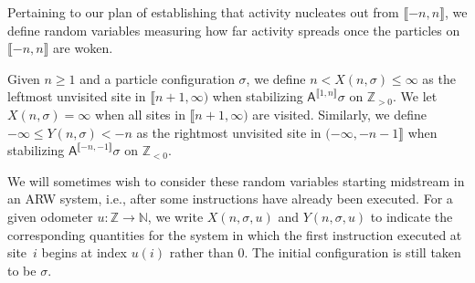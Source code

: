 \documentclass[ECP]{ejpecp} %
\begin{document}
Pertaining to our plan of establishing that activity nucleates out from
$\mathopen{\llbracket }-n,n \mathclose{\rrbracket }$, we define random variables measuring how far activity spreads
once the particles on $\mathopen{\llbracket }-n,n \mathclose{\rrbracket }$ are woken.
%
\begin{definition}
\label{defn2.2}
Given $n\ge 1$ and a particle configuration $\sigma $, we define
$n<X(n, \sigma )\leq \infty $ as the leftmost unvisited site in
$\llbracket n+1,\infty )$ when stabilizing
$\mathsf{A}^{\mathopen{\llbracket }1,n \mathclose{\rrbracket }}\sigma $ on $\mathbb{Z}_{>0}$. We let
$X(n,\sigma )=\infty $ when all sites in $\llbracket n+1,\infty )$ are
visited. Similarly, we define $-\infty \le Y(n, \sigma ) < -n$ as the rightmost
unvisited site in $(-\infty ,-n-1\rrbracket $ when stabilizing
$\mathsf{A}^{\mathopen{\llbracket }-n,-1\mathclose{\rrbracket }}\sigma $ on $\mathbb{Z}_{<0}$.

We will sometimes wish to consider these random variables starting midstream
in an ARW system, i.e., after some instructions have already been executed.
For a given odometer $u \colon \mathbb{Z}\to \mathbb{N}$, we write
$X(n, \sigma , u)$ and $Y(n, \sigma , u)$ to indicate the corresponding
quantities for the system in which the first instruction executed at site~$i$
begins at index $u(i)$ rather than $0$. The initial configuration is still
taken to be $\sigma $.
\end{definition}
\end{document}
